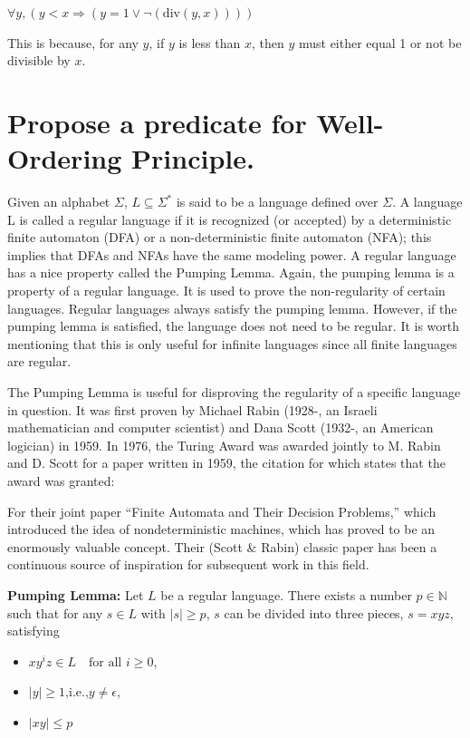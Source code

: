 \documentclass{article}
\begin{document}
$ \forall y, \left( y < x \Rightarrow \left( y = 1 \lor \lnot \left( \text{div}(y, x) \right) \right) \right) $

This is because, for any $y$, if $y$ is less than $x$, then $y$ must either equal 1 or not be divisible by $x$.



\section{Propose a predicate for Well-Ordering Principle.}

Given an alphabet $\Sigma$, $L \subseteq \Sigma^*$ is said to be a language defined over $\Sigma$. A language L is called a regular language if it is recognized (or accepted) by a deterministic finite automaton (DFA) or a non-deterministic finite automaton (NFA); this implies that DFAs and NFAs have the same modeling power. A regular language has a nice property called the Pumping Lemma. Again, the pumping lemma is a property of a regular language. It is used to prove the non-regularity of certain languages. Regular languages always satisfy the pumping lemma. However, if the pumping lemma is satisfied, the language does not need to be regular. It is worth mentioning that this is only useful for infinite languages since all finite languages are regular.

The Pumping Lemma is useful for disproving the regularity of a specific language in question. It was first proven by Michael Rabin (1928-, an Israeli mathematician and computer scientist) and Dana Scott (1932-, an American logician) in 1959. In 1976, the Turing Award was awarded jointly to M. Rabin and D. Scott for a paper written in 1959, the citation for which states that the award was granted:

For their joint paper “Finite Automata and Their Decision Problems,” which introduced the idea of nondeterministic machines, which has proved to be an enormously valuable concept. Their (Scott \& Rabin) classic paper has been a continuous source of inspiration for subsequent work in this field.

\begin{tcolorbox}
  \textbf{ Pumping Lemma:} Let $L$ be a regular language. There exists a number $p \in \mathbb{N}$ such that for any $s \in L$ with $\left\lvert s\right\rvert \geq  p$, $s$ can be divided into three pieces, $s = xyz$, satisfying
  \begin{itemize}
    \item $xy^iz \in L \quad \text{for all } i \geq 0$,
    \item $\left\lvert y\right\rvert \geq 1 \text{,i.e.,} y \neq \epsilon $,
    \item $\left\lvert xy \right\rvert \leq p$
  \end{itemize}
\end{tcolorbox}
\end{document}
